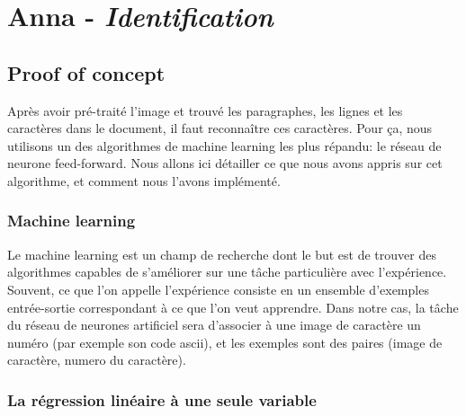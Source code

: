 \chapter{Anna - \emph{Identification}}

\section{Proof of concept}
Après avoir pré-traité l'image et trouvé les paragraphes, les lignes et les caractères dans le document, il faut reconnaître ces caractères. Pour ça, nous utilisons un des algorithmes de machine learning les plus répandu: le réseau de neurone feed-forward. Nous allons ici détailler ce que nous avons appris sur cet algorithme, et comment nous l'avons implémenté.

\subsection{Machine learning}

Le machine learning est un champ de recherche dont le but est de trouver des algorithmes capables de s'améliorer sur une tâche particulière avec l'expérience. Souvent, ce que l'on appelle l'expérience consiste en un ensemble d'exemples entrée-sortie correspondant à ce que l'on veut apprendre. Dans notre cas, la tâche du réseau de neurones artificiel sera d'associer à une image de caractère un numéro (par exemple son code ascii), et les exemples sont des paires (image de caractère, numero du caractère).

\subsection{La régression linéaire à une seule variable}

